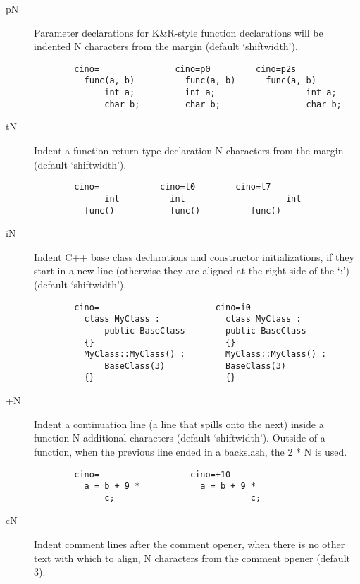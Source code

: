 \begin{description}
\begin{verbatim}
 \end{verbatim}
    \item[pN] Parameter declarations for K\&R-style function declarations will
          be indented N characters from the margin  (default
          `shiftwidth').
\begin{verbatim}
        cino=               cino=p0         cino=p2s
          func(a, b)          func(a, b)      func(a, b)
              int a;          int a;                  int a;
              char b;         char b;                 char b;
 \end{verbatim}
    \item[tN] Indent a function return type declaration N characters from the
          margin  (default `shiftwidth').
\begin{verbatim}
        cino=            cino=t0        cino=t7
              int          int                    int
          func()           func()          func()
 \end{verbatim}
    \item[iN] Indent C++ base class declarations and constructor
          initializations, if they start in a new line (otherwise they
          are aligned at the right side of the `:')
          (default `shiftwidth').
\begin{verbatim}
        cino=                       cino=i0
          class MyClass :             class MyClass :
              public BaseClass        public BaseClass
          {}                          {}
          MyClass::MyClass() :        MyClass::MyClass() :
              BaseClass(3)            BaseClass(3)
          {}                          {}
 \end{verbatim}
 \clearpage
    \item[+N] Indent a continuation line (a line that spills onto the next)
              inside a function N additional characters  (default
              `shiftwidth').
              Outside of a function, when the previous line ended in a
              backslash, the 2 * N is used.
\begin{verbatim}
        cino=                  cino=+10
          a = b + 9 *            a = b + 9 *
              c;                           c;
 \end{verbatim}
    \item[cN] Indent comment lines after the comment opener, when there is no
          other text with which to align, N characters from the comment
          opener  (default 3).
\begin{verbatim}

\end{verbatim}
\end{description}
